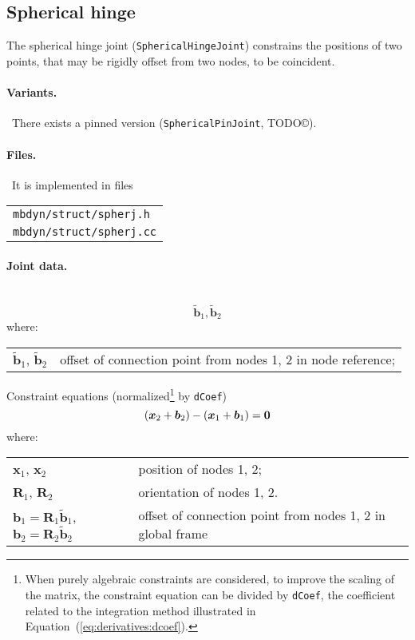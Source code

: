 \documentclass[10pt,dvips,fleqn,subeqn]{report}
\newcommand{\T}[1]{\bm{#1}}
\begin{document}
\subsection{Spherical hinge}
The spherical hinge joint (\texttt{SphericalHingeJoint}) constrains the positions
of two points, that may be rigidly offset from two nodes, to be coincident.

\paragraph{Variants.} \
There exists a pinned version (\texttt{SphericalPinJoint}, TODO\copyright).

\paragraph{Files.} \
It is implemented in files

\begin{tabular}{l}
\texttt{mbdyn/struct/spherj.h} \\
\texttt{mbdyn/struct/spherj.cc}
\end{tabular}

\paragraph{Joint data.} \
\begin{equation}
	\tilde{\T{b}}_1, \tilde{\T{b}}_2
\end{equation}
where:

\noindent
\begin{tabular}{ll}
$\tilde{\T{b}}_1$, $\tilde{\T{b}}_2$ & offset of connection point from nodes 1, 2 in node reference; \\
\end{tabular}

\noindent
Constraint equations (normalized\footnote{When purely algebraic
constraints are considered, to improve the scaling of the matrix,
the constraint equation can be divided by \texttt{dCoef},
the coefficient related to the integration method illustrated 
in Equation~(\ref{eq:derivatives:dcoef}).
} by \texttt{dCoef})
\begin{equation}
	\plbr{\T{x}_2 + \T{b}_2} - \plbr{\T{x}_1 + \T{b}_1} = \T{0}
\end{equation}
where:

\noindent
\begin{tabular}{ll}
$\T{x}_1$, $\T{x}_2$ & position of nodes 1, 2; \\
$\T{R}_1$, $\T{R}_2$ & orientation of nodes 1, 2.\\
$\T{b}_1 = \T{R}_1 \tilde{\T{b}}_1$, $\T{b}_2 = \T{R}_2 \tilde{\T{b}}_2$ & offset of connection point from nodes 1, 2 in global frame
\end{tabular}
\end{document}
